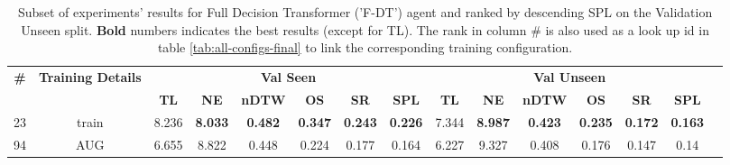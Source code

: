 \begin{table}
\centering
\caption{\label{tab:f_dt_env_drop}Subset of experiments' results for Full Decision Transformer ('F-DT') agent and ranked by descending SPL on the Validation Unseen split. \textbf{Bold} numbers indicates the best results (except for TL). The rank in column \# is also used as a look up id in table \ref{tab:all-configs-final} to link the corresponding training configuration.}
\begin{tabular}{@{\hskip3pt}c@{\hskip3pt}c@{\hskip3pt}c@{\hskip3pt}c@{\hskip3pt}c@{\hskip3pt}c@{\hskip3pt}c@{\hskip3pt}c@{\hskip3pt}c@{\hskip3pt}c@{\hskip3pt}c@{\hskip3pt}c@{\hskip3pt}c@{\hskip3pt}c@{\hskip3pt}c}
\toprule
                                  \textbf{\#} & \textbf{Training Details} & \multicolumn{6}{c}{\textbf{Val Seen}} & \multicolumn{6}{c}{\textbf{Val Unseen}} \\
\cmidrule(l){3-8}\cmidrule(l){9-14}\textbf{~} &                \textbf{~} &       \textbf{TL} &     \textbf{NE} &   \textbf{nDTW} &     \textbf{OS} &     \textbf{SR} &    \textbf{SPL} &         \textbf{TL} &     \textbf{NE} &   \textbf{nDTW} &     \textbf{OS} &     \textbf{SR} &    \textbf{SPL} \\
\midrule
                                           23 &                     train &             8.236 &  \textbf{8.033} &  \textbf{0.482} &  \textbf{0.347} &  \textbf{0.243} &  \textbf{0.226} &               7.344 &  \textbf{8.987} &  \textbf{0.423} &  \textbf{0.235} &  \textbf{0.172} &  \textbf{0.163} \\
                                           94 &                       AUG &             6.655 &           8.822 &           0.448 &           0.224 &           0.177 &           0.164 &               6.227 &           9.327 &           0.408 &           0.176 &           0.147 &            0.14 \\
\bottomrule
\end{tabular}
\end{table}
